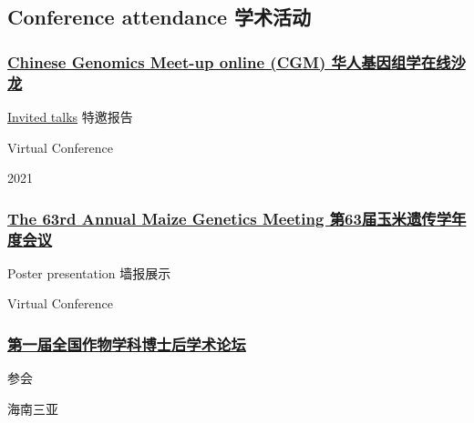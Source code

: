 \documentclass[]{article}
\begin{document}
\hypertarget{conference-attendance-ux5b66ux672fux6d3bux52a8}{%
\subsection{Conference attendance
学术活动}\label{conference-attendance-ux5b66ux672fux6d3bux52a8}}

\hypertarget{chinese-genomics-meet-up-online-cgm-ux534eux4ebaux57faux56e0ux7ec4ux5b66ux5728ux7ebfux6c99ux9f99}{%
\subsubsection{\texorpdfstring{\href{https://cgmonline.co/}{Chinese
Genomics Meet-up online (CGM)
华人基因组学在线沙龙}}{Chinese Genomics Meet-up online (CGM) 华人基因组学在线沙龙}}\label{chinese-genomics-meet-up-online-cgm-ux534eux4ebaux57faux56e0ux7ec4ux5b66ux5728ux7ebfux6c99ux9f99}}

\href{https://www.bilibili.com/video/BV1a44y147A5}{Invited talks}
特邀报告

Virtual Conference

2021

\hypertarget{the-63rd-annual-maize-genetics-meeting-ux7b2c63ux5c4aux7389ux7c73ux9057ux4f20ux5b66ux5e74ux5ea6ux4f1aux8bae}{%
\subsubsection{\texorpdfstring{\href{https://www.maizegdb.org/mgc/maizemeeting/2021/}{The
63rd Annual Maize Genetics Meeting
第63届玉米遗传学年度会议}}{The 63rd Annual Maize Genetics Meeting 第63届玉米遗传学年度会议}}\label{the-63rd-annual-maize-genetics-meeting-ux7b2c63ux5c4aux7389ux7c73ux9057ux4f20ux5b66ux5e74ux5ea6ux4f1aux8bae}}

Poster presentation 墙报展示

Virtual Conference

\hypertarget{ux7b2cux4e00ux5c4aux5168ux56fdux4f5cux7269ux5b66ux79d1ux535aux58ebux540eux5b66ux672fux8bbaux575b}{%
\subsubsection{\texorpdfstring{\href{http://ncpd.cau.edu.cn/}{第一届全国作物学科博士后学术论坛}}{第一届全国作物学科博士后学术论坛}}\label{ux7b2cux4e00ux5c4aux5168ux56fdux4f5cux7269ux5b66ux79d1ux535aux58ebux540eux5b66ux672fux8bbaux575b}}

参会

海南三亚
\end{document}
